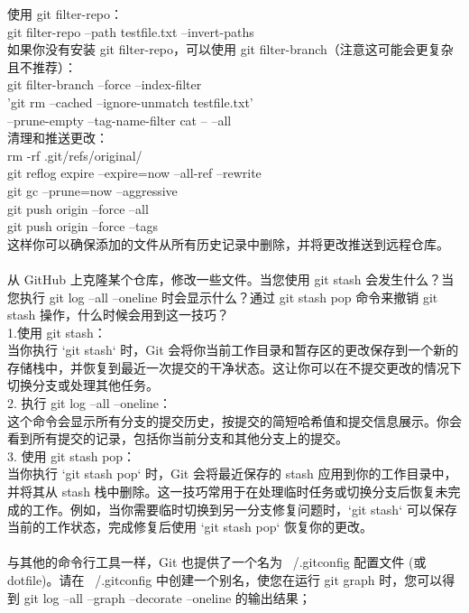 \documentclass[a4paper, 12pt]{article}
\begin{document}
   使用 git filter-repo：\\
   git filter-repo --path testfile.txt --invert-paths\\
   如果你没有安装 git filter-repo，可以使用 git filter-branch（注意这可能会更复杂且不推荐）：\\
   git filter-branch --force --index-filter \\
     'git rm --cached --ignore-unmatch testfile.txt' \\
     --prune-empty --tag-name-filter cat -- --all\\
清理和推送更改：\\
   rm -rf .git/refs/original/\\
   git reflog expire --expire=now --all-ref --rewrite\\
   git gc --prune=now --aggressive\\
   git push origin --force --all\\
   git push origin --force --tags\\
这样你可以确保添加的文件从所有历史记录中删除，并将更改推送到远程仓库。\\\\
从 GitHub 上克隆某个仓库，修改一些文件。当您使用 git stash 会发生什么？当您执行 git log --all --oneline 时会显示什么？通过 git stash pop 命令来撤销 git stash 操作，什么时候会用到这一技巧？\\
1.使用 git stash：\\
   当你执行 `git stash` 时，Git 会将你当前工作目录和暂存区的更改保存到一个新的存储栈中，并恢复到最近一次提交的干净状态。这让你可以在不提交更改的情况下切换分支或处理其他任务。\\
2. 执行 git log --all --oneline：\\
   这个命令会显示所有分支的提交历史，按提交的简短哈希值和提交信息展示。你会看到所有提交的记录，包括你当前分支和其他分支上的提交。\\
3. 使用 git stash pop：\\
   当你执行 `git stash pop` 时，Git 会将最近保存的 stash 应用到你的工作目录中，并将其从 stash 栈中删除。这一技巧常用于在处理临时任务或切换分支后恢复未完成的工作。例如，当你需要临时切换到另一分支修复问题时，`git stash` 可以保存当前的工作状态，完成修复后使用 `git stash pop` 恢复你的更改。\\\\
与其他的命令行工具一样，Git 也提供了一个名为 ~/.gitconfig 配置文件 (或 dotfile)。请在 ~/.gitconfig 中创建一个别名，使您在运行 git graph 时，您可以得到 git log --all --graph --decorate --oneline 的输出结果；\\
\end{document}
